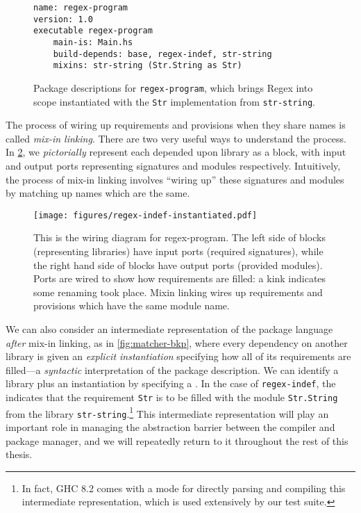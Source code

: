 \begin{figure}
\begin{lstlisting}[language=Cabal]
name: regex-program
version: 1.0
executable regex-program
    main-is: Main.hs
    build-depends: base, regex-indef, str-string
    mixins: str-string (Str.String as Str)
\end{lstlisting}
\caption{Package descriptions for \texttt{regex-program}, which brings
Regex into scope instantiated with the \texttt{Str} implementation from \texttt{str-string}.}
\label{fig:matcher-functorized-packages}
\end{figure}

The process of wiring up requirements and provisions when they share names
is called \emph{mix-in linking}.  There are two very useful
ways to understand the process.  In \cref{fig:regex-indef-instantiated}, we
\emph{pictorially} represent each depended upon library as a block, with input and output
ports representing signatures and modules respectively.  Intuitively, the process
of mix-in linking involves ``wiring up'' these signatures and modules by matching
up names which are the same.

\begin{figure}
\center%
\texttt{[image: figures/regex-indef-instantiated.pdf]}
\caption{This is the wiring diagram for regex-program. The left side of blocks
(representing libraries) have input ports (required signatures), while the right hand side
of blocks have output ports (provided modules). Ports are wired to show how requirements are
filled: a kink indicates some renaming took place. Mixin linking wires up requirements
and provisions which have the same module name.}
\label{fig:regex-indef-instantiated}
\end{figure}

We can also consider an intermediate representation of the package language
\emph{after} mix-in linking,
as in \cref{fig:matcher-bkp}, where every dependency on another library
is given an \emph{explicit instantiation} specifying how all of its requirements
are filled---a \emph{syntactic} interpretation of
the package description. We can identify a library plus an instantiation by
specifying a \emph{\uid{}}.  In the case of \verb|regex-indef|, the
\uid{} indicates that the requirement \verb|Str| is to be filled
with the module \verb|Str.String| from the library \verb|str-string|.\footnote{In
fact, GHC 8.2 comes with a mode for directly parsing and compiling this intermediate
representation, which is used extensively by our test suite.}  This intermediate
representation will play an important role in managing the abstraction barrier
between the compiler and package manager, and we will repeatedly return to
it throughout the rest of this thesis.


